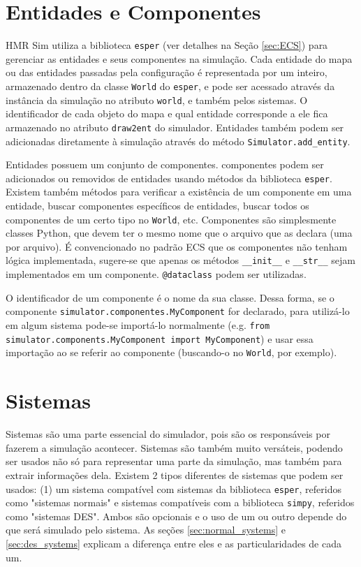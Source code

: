 \section{Entidades e Componentes}
\label{sec:ents_and_components}

HMR Sim utiliza a biblioteca \texttt{esper} \cite{esper} (ver detalhes na Seção \ref{sec:ECS}) para gerenciar as entidades e seus componentes na simulação. Cada entidade do mapa ou das entidades passadas pela configuração é representada por um inteiro, armazenado dentro da classe \texttt{World} do \texttt{esper}, e pode ser acessado através da instância da simulação no atributo \texttt{world}, e também pelos sistemas. O identificador de cada objeto do mapa e qual entidade corresponde a ele fica armazenado no atributo \texttt{draw2ent} do simulador. Entidades também podem ser adicionadas diretamente à simulação através do método \texttt{Simulator.add\_entity}.

Entidades possuem um conjunto de componentes. componentes podem ser adicionados ou removidos de entidades usando métodos da biblioteca \texttt{esper}. Existem também métodos para verificar a existência de um componente em uma entidade, buscar componentes específicos de entidades, buscar todos os componentes de um certo tipo no \texttt{World}, etc. Componentes são simplesmente classes Python, que devem ter o mesmo nome que o arquivo que as declara (uma por arquivo). É convencionado no padrão ECS que os componentes não tenham lógica implementada, sugere-se que apenas os métodos \texttt{\_\_init\_\_} e \texttt{\_\_str\_\_} sejam implementados em um componente. \texttt{@dataclass} podem ser utilizadas. 

O identificador de um componente é o nome da sua classe. Dessa forma, se o componente \texttt{simulator.componentes.MyComponent} for declarado, para utilizá-lo em algum sistema pode-se importá-lo normalmente (e.g. \texttt{from simulator.components.MyComponent import MyComponent}) e usar essa importação ao se referir ao componente (buscando-o no \texttt{World}, por exemplo).

\section{Sistemas}
\label{sec:systems}

Sistemas são uma parte essencial do simulador, pois são os responsáveis por fazerem a simulação acontecer. Sistemas são também muito versáteis, podendo ser usados não só para representar uma parte da simulação, mas também para extrair informações dela. Existem 2 tipos diferentes de sistemas que podem ser usados: (1) um sistema compatível com sistemas da biblioteca \texttt{esper}, referidos como "sistemas normais" e sistemas compatíveis com a biblioteca \texttt{simpy}, referidos como "sistemas DES". Ambos são opcionais e o uso de um ou outro depende do que será simulado pelo sistema. As seções \ref{sec:normal_systems} e \ref{sec:des_systems} explicam a diferença entre eles e as particularidades de cada um.

